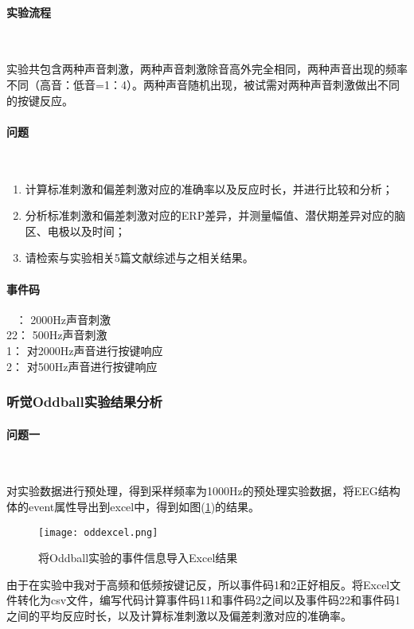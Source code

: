 \documentclass{hitreport}
\begin{document}
\paragraph{实验流程}~{}
 
实验共包含两种声音刺激，两种声音刺激除音高外完全相同，两种声音出现的频率不同（高音：低音=1：4）。两种声音随机出现，被试需对两种声音刺激做出不同的按键反应。

\paragraph{问题}~{}

\begin{enumerate}
\item 计算标准刺激和偏差刺激对应的准确率以及反应时长，并进行比较和分析；
\item 分析标准刺激和偏差刺激对应的ERP差异，并测量幅值、潜伏期差异对应的脑区、电极以及时间；
\item 请检索与实验相关5篇文献综述与之相关结果。
\end{enumerate}

\paragraph{事件码}~{}
： 2000Hz声音刺激\\
22： 500Hz声音刺激\\
1： 对2000Hz声音进行按键响应\\
2： 对500Hz声音进行按键响应

\subsubsection{听觉Oddball实验结果分析}

\paragraph{问题一}~{}\label{sec:oddballques1}

对实验数据进行预处理，得到采样频率为1000Hz的预处理实验数据，将EEG结构体的event属性导出到excel中，得到如图(\ref{fig:oddexcel})的结果。

\begin{figure}[htb]
\centering
\texttt{[image: oddexcel.png]}
\caption{将Oddball实验的事件信息导入Excel结果}\label{fig:oddexcel}
\end{figure}

由于在实验中我对于高频和低频按键记反，所以事件码1和2正好相反。将Excel文件转化为csv文件，编写代码计算事件码11和事件码2之间以及事件码22和事件码1之间的平均反应时长，以及计算标准刺激以及偏差刺激对应的准确率。
\end{document}
